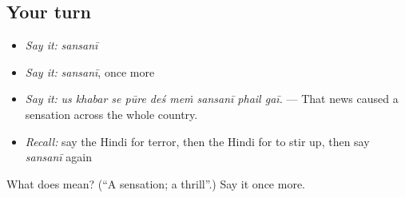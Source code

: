 \subsection*{Your turn}
\begin{itemize}
\raggedright
  \item \emph{Say it:} \emph{sansanī}
  \item \emph{Say it:} \emph{sansanī}, once more
  \item \emph{Say it:} \emph{us khabar se pūre deś meṁ sansanī phail gaī.} — That news caused a sensation across the whole country.
  \item \emph{Recall:} say the Hindi for terror, then the Hindi for to stir up, then say \emph{sansanī} again
\end{itemize}

\begin{tcolorbox}[breakable,colback=teal!4,colframe=teal!35!black,title={Before you move on}]
What does  mean? (\textquotedblleft{}A sensation; a thrill\textquotedblright{}.) Say it once more.
\end{tcolorbox}
